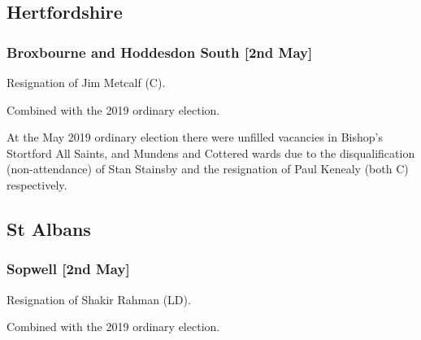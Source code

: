 \begin{resultsiii}
	\section{Hertfordshire}
	
	
	\subsubsection*{Broxbourne and Hoddesdon South \hspace*{\fill}\nolinebreak[1]%
		\enspace\hspace*{\fill}
		[2nd May]}
	
	
	Resignation of Jim Metcalf (C).
	
	Combined with the 2019 ordinary election.
	
	
	At the May 2019 ordinary election there were unfilled vacancies in Bishop's Stortford All Saints, and Mundens and Cottered wards due to the disqualification (non-attendance) of Stan Stainsby and the resignation of Paul Kenealy (both C) respectively.
	
\subsection*{St Albans}
	
	\subsubsection*{Sopwell \hspace*{\fill}\nolinebreak[1]%
		\enspace\hspace*{\fill}
		[2nd May]}
	
	
	Resignation of Shakir Rahman (LD).
	
	Combined with the 2019 ordinary election.
	

\end{resultsiii}
